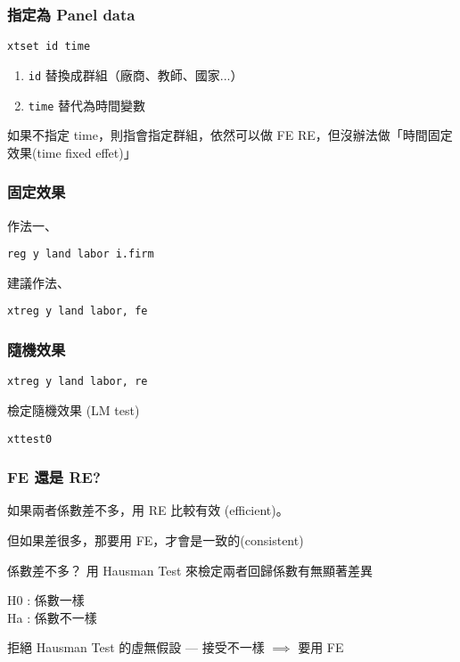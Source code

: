 \begin{frame}[fragile]
    \frametitle{指定為 Panel data}

    \begin{lstlisting}
xtset id time \end{lstlisting}
\begin{enumerate}
    \item \texttt{id} 替換成群組（廠商、教師、國家...）
    \item \texttt{time} 替代為時間變數
\end{enumerate}

如果不指定 time，則指會指定群組，依然可以做 FE RE，但沒辦法做「時間固定效果(time fixed effet)」
\end{frame}

\begin{frame}[fragile]
    \frametitle{固定效果}

    作法一、
    \begin{lstlisting}
reg y land labor i.firm \end{lstlisting}

    建議作法、
    \begin{lstlisting}
xtreg y land labor, fe \end{lstlisting}    

\end{frame}

\begin{frame}[fragile]
    \frametitle{隨機效果}

    \begin{lstlisting}
xtreg y land labor, re \end{lstlisting}    

    檢定隨機效果 (LM test)
    \begin{lstlisting}
xttest0 \end{lstlisting}    

\end{frame}

\begin{frame}
    \frametitle{FE 還是 RE?}
    如果兩者係數差不多，用 RE 比較有效 (efficient)。

    但如果差很多，那要用 FE，才會是一致的(consistent)

    \begin{block}{係數差不多？}
        用 Hausman Test 來檢定兩者回歸係數有無顯著差異

        H0 : 係數一樣\\
        Ha : 係數不一樣

        拒絕 Hausman Test 的虛無假設 --- 接受不一樣 $\implies$ 要用 FE
    \end{block}

\end{frame}

